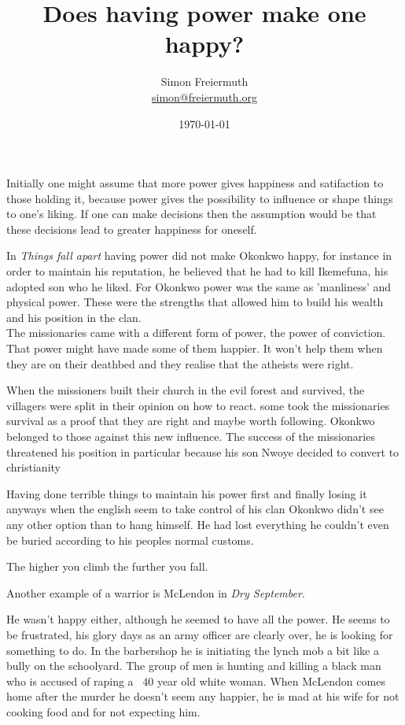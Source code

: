 \documentclass[12pt, letterpaper, twoside]{article}
\title{Does having power make one happy?}
\author{Simon Freiermuth \\ \href{mailto:simon@freiermuth.org}{simon@freiermuth.org}}
\date{\today}
\begin{document}
\maketitle

\begin{flushleft}

Initially one might assume that more power gives happiness and satifaction to those holding it,
because power gives the possibility to influence or shape things to one's liking.
If one can make decisions then the assumption would be that these decisions lead to greater happiness for oneself.

In \textit{Things fall apart} having power did not make Okonkwo happy, for instance in order to maintain his reputation,
he believed that he had to kill Ikemefuna, his adopted son who he liked. For Okonkwo power was the same as 'manliness' and physical power.
These were the strengths that allowed him to build his wealth and his position in the clan.\\

The missionaries came with a different form of power, the power of conviction. That power might have made some of them happier.
It won't help them when they are on their deathbed and they realise that the atheists were right.

When the missioners built their church in the evil forest and survived, the villagers were split in their opinion on how to react.
some took the missionaries survival as a proof that they are right and maybe worth following.
Okonkwo belonged to those against this new influence. The success of the missionaries threatened his position
in particular because his son Nwoye decided to convert to christianity

Having done terrible things to maintain his power first and finally losing it anyways when the english seem to take control of his clan
Okonkwo didn't see any other option than to hang himself. He had lost everything he couldn't even be buried according to his
peoples normal customs.

The higher you climb the further you fall.

\hfill

Another example of a warrior is McLendon in \textit{Dry September}.

He wasn't happy either, although he seemed to have all the power.
He seems to be frustrated, his glory days as an army officer are clearly over, he is looking for something to do.
In the barbershop he is initiating the lynch mob a bit like a bully on the schoolyard. The group of men is hunting and killing a black man
who is accused of raping a ~40 year old white woman.
When McLendon comes home after the murder he doesn't seem any happier, he is mad at his wife for not cooking food and for not expecting him.


\end{flushleft}
\end{document}
